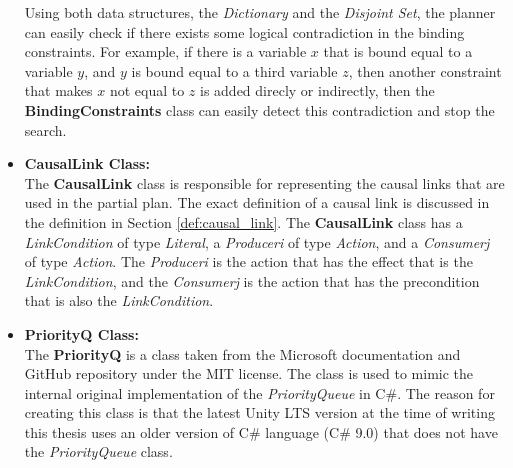 \begin{itemize}
          Using both data structures, the \textit{Dictionary} and the \textit{Disjoint Set}, the planner can easily check if there exists some logical contradiction in the binding constraints. For example, if there is a variable $x$ that is bound equal to a variable $y$, and $y$ is bound equal to a third variable $z$, then another constraint that makes $x$ not equal to $z$ is added direcly or indirectly, then the \textbf{BindingConstraints} class can easily detect this contradiction and stop the search.

    \item \textbf{CausalLink Class:} \\
          The \textbf{CausalLink} class is responsible for representing the causal links that are used in the partial plan. The exact definition of a causal link is discussed in the definition in Section \ref{def:causal_link}. The \textbf{CausalLink} class has a \textit{LinkCondition} of type \textit{Literal}, a \textit{Produceri} of type \textit{Action}, and a \textit{Consumerj} of type \textit{Action}.
          The \textit{Produceri} is the action that has the effect that is the \textit{LinkCondition}, and the \textit{Consumerj} is the action that has the precondition that is also the \textit{LinkCondition}.

    \item \textbf{PriorityQ Class:} \\
          The \textbf{PriorityQ} is a class taken from the Microsoft documentation and GitHub repository under the MIT license\cite{MicrosoftPQ}\cite{GitHubPQ}. The class is used to mimic the internal original implementation of the \textit{PriorityQueue} in C\#. The reason for creating this class is that the latest Unity \ac{LTS} version at the time of writing this thesis uses an older version of C\# language (C\# 9.0) that does not have the \textit{PriorityQueue} class.

\end{itemize}


